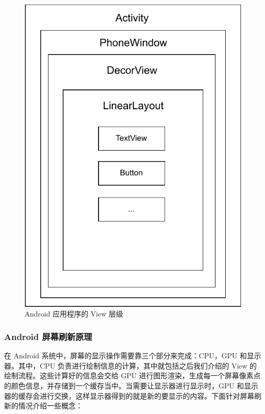 \begin{figure}
    \centering
    \includegraphics[scale=0.7]{assets/view-hierarchy.pdf}
    \caption{Android 应用程序的 View 层级}
\end{figure}

\subsubsection*{Android 屏幕刷新原理}

在 Android 系统中，屏幕的显示操作需要靠三个部分来完成：CPU，GPU 和显示器。其中，CPU 负责进行绘制信息的计算，其中就包括之后我们介绍的 View 的绘制流程。这些计算好的信息会交给 GPU 进行图形渲染，生成每一个屏幕像素点的颜色信息，并存储到一个缓存当中。当需要让显示器进行显示时，GPU 和显示器的缓存会进行交换，这样显示器得到的就是新的要显示的内容。下面针对屏幕刷新的情况介绍一些概念：

